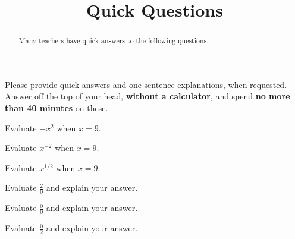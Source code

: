 \documentclass{ximera}
\title{Quick Questions}
\begin{document}
\begin{abstract}
Many teachers have quick answers to the following questions.  
\end{abstract}
\maketitle

Please provide quick answers and one-sentence explanations, when requested.  Answer off the top of your head, \textbf{without a calculator}, and spend \textbf{no more than 40 minutes} on these.  

%
%

\begin{question}
Evaluate $-x^2$ when $x=9$.
\begin{freeResponse}
\end{freeResponse}
\end{question}

\begin{question}
Evaluate $x^{-2}$ when $x=9$.
\begin{freeResponse}
\end{freeResponse}
\end{question}

\begin{question}
Evaluate $x^{1/2}$ when $x=9$.
\begin{freeResponse}
\end{freeResponse}
\end{question}

\begin{question}
Evaluate $\frac{2}{0}$ and explain your answer. 
\begin{freeResponse}
\end{freeResponse}
\end{question}

\begin{question}
Evaluate $\frac{0}{0}$ and explain your answer. 
\begin{freeResponse}
\end{freeResponse}
\end{question}

\begin{question}
Evaluate $\frac{0}{2}$ and explain your answer. 
\begin{freeResponse}
\end{freeResponse}
\end{question}
\end{document}
